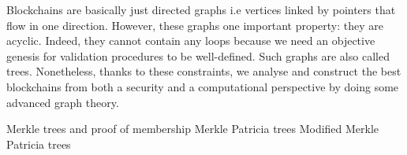 Blockchains are basically just directed graphs i.e vertices linked by pointers that flow in one direction. However, these graphs one important property: they are acyclic. Indeed, they cannot contain any loops because we need an objective genesis for validation procedures to be well-defined. Such graphs are also called trees. Nonetheless, thanks to these constraints, we analyse and construct the best blockchains from both a security and a computational perspective by doing some advanced graph theory.

Merkle trees and proof of membership
Merkle Patricia trees
Modified Merkle Patricia trees
